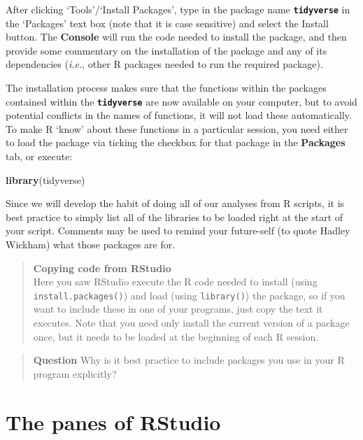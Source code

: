 \documentclass[]{book}
\newenvironment{Shaded}{\begin{snugshade}}{\end{snugshade}}
\newcommand{\KeywordTok}[1]{\textcolor[rgb]{0.13,0.29,0.53}{\textbf{#1}}}
\newcommand{\NormalTok}[1]{#1}
\theoremstyle{definition}
\theoremstyle{definition}
\theoremstyle{definition}
\theoremstyle{remark}
\begin{document}
After clicking `Tools'/`Install Packages', type in the package name
\textbf{\texttt{tidyverse}} in the `Packages' text box (note that it is
case sensitive) and select the Install button. The \textbf{Console} will
run the code needed to install the package, and then provide some
commentary on the installation of the package and any of its
dependencies (\emph{i.e.}, other R packages needed to run the required
package).

The installation process makes sure that the functions within the
packages contained within the \textbf{\texttt{tidyverse}} are now
available on your computer, but to avoid potential conflicts in the
names of functions, it will not load these automatically. To make R
`know' about these functions in a particular session, you need either to
load the package via ticking the checkbox for that package in the
\textbf{Packages} tab, or execute:

\begin{Shaded}
\begin{Highlighting}[]
\KeywordTok{library}\NormalTok{(tidyverse)}
\end{Highlighting}
\end{Shaded}

Since we will develop the habit of doing all of our analyses from R
scripts, it is best practice to simply list all of the libraries to be
loaded right at the start of your script. Comments may be used to remind
your future-self (to quote Hadley Wickham) what those packages are for.

\begin{quote}
\textbf{Copying code from RStudio}\\
Here you saw RStudio execute the R code needed to install (using
\texttt{install.packages()}) and load (using \texttt{library()}) the
package, so if you want to include these in one of your programs, just
copy the text it executes. Note that you need only install the current
version of a package once, but it needs to be loaded at the beginning of
each R session.
\end{quote}

\begin{quote}
\textbf{Question} Why is it best practice to include packages you use in
your R program explicitly?
\end{quote}

\section{The panes of RStudio}\label{the-panes-of-rstudio}
\end{document}
